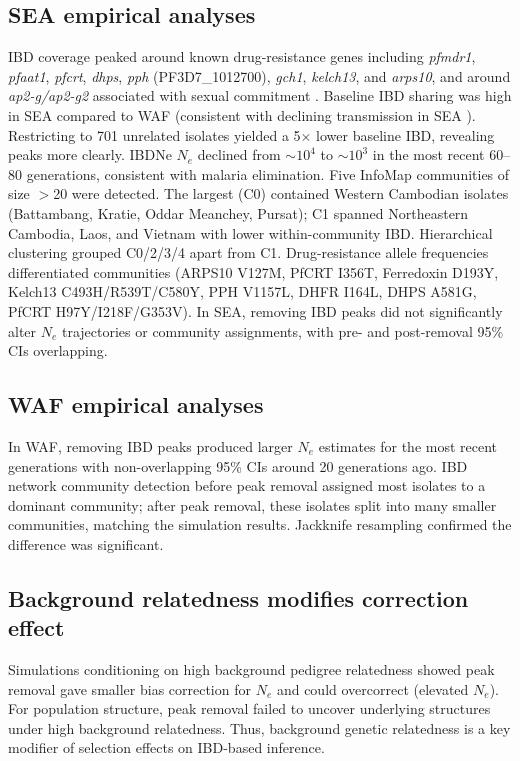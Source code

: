 \documentclass[11pt]{article}
\begin{document}
\subsection{SEA empirical analyses}
IBD coverage peaked around known drug-resistance genes including \textit{pfmdr1}, \textit{pfaat1}, \textit{pfcrt}, \textit{dhps}, \textit{pph} (PF3D7\_1012700), \textit{gch1}, \textit{kelch13}, and \textit{arps10}, and around \textit{ap2-g/ap2-g2} associated with sexual commitment \citep{r43,r60,r61,r62,r63,r64,r65,r66,r67,r68,r69,r70}. Baseline IBD sharing was high in SEA compared to WAF (consistent with declining transmission in SEA \citep{r1,r9}). Restricting to 701 unrelated isolates yielded a 5$\times$ lower baseline IBD, revealing peaks more clearly. IBDNe $N_e$ declined from $\sim$$10^4$ to $\sim$$10^3$ in the most recent 60--80 generations, consistent with malaria elimination. Five InfoMap communities of size $>$20 were detected. The largest (C0) contained Western Cambodian isolates (Battambang, Kratie, Oddar Meanchey, Pursat); C1 spanned Northeastern Cambodia, Laos, and Vietnam with lower within-community IBD. Hierarchical clustering grouped C0/2/3/4 apart from C1. Drug-resistance allele frequencies differentiated communities (ARPS10 V127M, PfCRT I356T, Ferredoxin D193Y, Kelch13 C493H/R539T/C580Y, PPH V1157L, DHFR I164L, DHPS A581G, PfCRT H97Y/I218F/G353V). In SEA, removing IBD peaks did not significantly alter $N_e$ trajectories or community assignments, with pre- and post-removal 95\% CIs overlapping.

\subsection{WAF empirical analyses}
In WAF, removing IBD peaks produced larger $N_e$ estimates for the most recent generations with non-overlapping 95\% CIs around 20 generations ago. IBD network community detection before peak removal assigned most isolates to a dominant community; after peak removal, these isolates split into many smaller communities, matching the simulation results. Jackknife resampling confirmed the difference was significant.

\subsection{Background relatedness modifies correction effect}
Simulations conditioning on high background pedigree relatedness showed peak removal gave smaller bias correction for $N_e$ and could overcorrect (elevated $N_e$). For population structure, peak removal failed to uncover underlying structures under high background relatedness. Thus, background genetic relatedness is a key modifier of selection effects on IBD-based inference.
\end{document}
